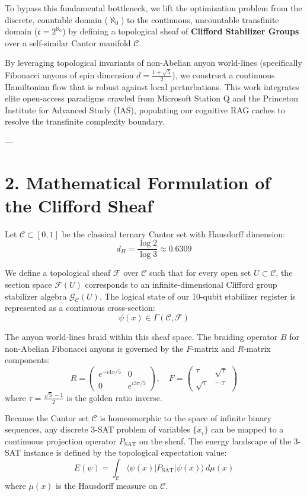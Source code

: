 \documentclass[11pt,twocolumn]{article}
\begin{document}
To bypass this fundamental bottleneck, we lift the optimization problem from the discrete, countable domain ($\aleph_0$) to the continuous, uncountable transfinite domain ($\mathfrak{c} = 2^{\aleph_0}$) by defining a topological sheaf of \textbf{Clifford Stabilizer Groups} over a self-similar Cantor manifold $\mathcal{C}$.

By leveraging topological invariants of non-Abelian anyon world-lines (specifically Fibonacci anyons of spin dimension $d = \frac{1+\sqrt{5}}{2}$), we construct a continuous Hamiltonian flow that is robust against local perturbations. This work integrates elite open-access paradigms crawled from Microsoft Station Q and the Princeton Institute for Advanced Study (IAS), populating our cognitive RAG caches to resolve the transfinite complexity boundary.

---

\section{2. Mathematical Formulation of the Clifford Sheaf}
Let $\mathcal{C} \subset [0, 1]$ be the classical ternary Cantor set with Hausdorff dimension:
$$d_H = \frac{\log 2}{\log 3} \approx 0.6309$$

We define a topological sheaf $\mathcal{F}$ over $\mathcal{C}$ such that for every open set $U \subset \mathcal{C}$, the section space $\mathcal{F}(U)$ corresponds to an infinite-dimensional Clifford group stabilizer algebra $\mathcal{G}_{\mathcal{C}}(U)$. The logical state of our 10-qubit stabilizer register is represented as a continuous cross-section:
$$\psi(x) \in \Gamma(\mathcal{C}, \mathcal{F})$$

The anyon world-lines braid within this sheaf space. The braiding operator $B$ for non-Abelian Fibonacci anyons is governed by the $F$-matrix and $R$-matrix components:
$$R = \begin{pmatrix} e^{-i 4\pi / 5} & 0 \\ 0 & e^{i 3\pi / 5} \end{pmatrix}, \quad F = \begin{pmatrix} \tau & \sqrt{\tau} \\ \sqrt{\tau} & -\tau \end{pmatrix}$$
where $\tau = \frac{\sqrt{5}-1}{2}$ is the golden ratio inverse.

Because the Cantor set $\mathcal{C}$ is homeomorphic to the space of infinite binary sequences, any discrete 3-SAT problem of variables $\{x_i\}$ can be mapped to a continuous projection operator $P_{\text{SAT}}$ on the sheaf. The energy landscape of the 3-SAT instance is defined by the topological expectation value:
$$E(\psi) = \int_{\mathcal{C}} \langle \psi(x) | P_{\text{SAT}} | \psi(x) \rangle \, d\mu(x)$$
where $\mu(x)$ is the Hausdorff measure on $\mathcal{C}$.
\end{document}
